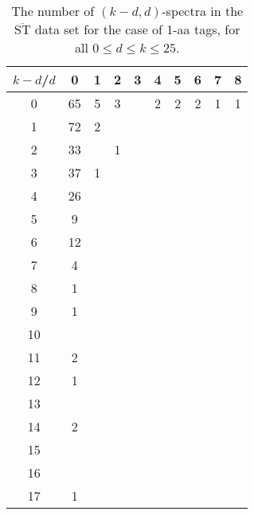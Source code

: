 \documentclass{article}
\def\STbar{{\overline{\mathrm{ST}}}}
\begin{document}
\begin{table}[h]\footnotesize
{\centering
\begin{tabular}{|c|c|
c|c|c|c|c|c|c|c|}
  \hline
  $k-d$/$d$ 
 & 0 & 1 & 2 & 3 & 4 & 5 & 6 & 7 & 8\\

  \hline
  \hline

0  & 65 & 5 & 3 &  & 2 & 2 & 2 & 1 & 1\\

1  & 72 & 2 &  &  &  &  &  &  & \\

2  & 33 &  & 1 &  &  &  &  &  & \\

3  & 37 & 1 &  &  &  &  &  &  & \\

4  & 26 &  &  &  &  &  &  &  & \\

5  & 9 &  &  &  &  &  &  &  & \\

6  & 12 &  &  &  &  &  &  &  & \\

7  & 4 &  &  &  &  &  &  &  & \\

8  & 1 &  &  &  &  &  &  &  & \\

9  & 1 &  &  &  &  &  &  &  & \\

10  &  &  &  &  &  &  &  &  & \\

11  & 2 &  &  &  &  &  &  &  & \\

12  & 1 &  &  &  &  &  &  &  & \\

13  &  &  &  &  &  &  &  &  & \\

14  & 2 &  &  &  &  &  &  &  & \\

15  &  &  &  &  &  &  &  &  & \\

16  &  &  &  &  &  &  &  &  & \\

17  & 1 &  &  &  &  &  &  &  & \\

  \hline
\end{tabular}
\par}
\centering
\caption{The number of $(k-d,d)$-spectra in the $\STbar$ data set for the case of 1-aa tags, for all $0\le d\le k\le 25$.}
\vspace{3mm}
\label{table:kd-1-ST}
\end{table}
\end{document}
